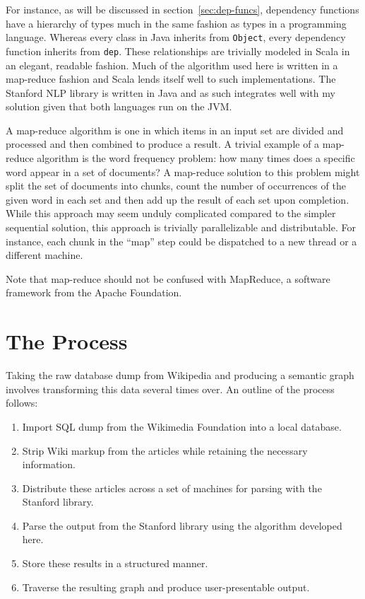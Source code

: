 For instance, as will be discussed in section~\ref{sec:dep-funcs}, dependency functions have a hierarchy of types much in the same fashion as types in a programming language.  Whereas every class in Java inherits from \verb|Object|, every dependency function inherits from \verb|dep|.  These relationships are trivially modeled in Scala in an elegant, readable fashion.  Much of the algorithm used here is written in a map-reduce fashion and Scala lends itself well to such implementations.  The Stanford NLP library is written in Java and as such integrates well with my solution given that both languages run on the JVM.  

A map-reduce algorithm is one in which items in an input set are divided and processed and then combined to produce a result.  A trivial example of a map-reduce algorithm is the word frequency problem: how many times does a specific word appear in a set of documents?  A map-reduce solution to this problem might split the set of documents into chunks, count the number of occurrences of the given word in each set and then add up the result of each set upon completion.  While this approach may seem unduly complicated compared to the simpler sequential solution, this approach is trivially parallelizable and distributable.  For instance, each chunk in the ``map'' step could be dispatched to a new thread or a different machine.  

Note that map-reduce should not be confused with MapReduce, a software framework from the Apache Foundation.  

\chapter{The Process}

Taking the raw database dump from Wikipedia and producing a semantic graph involves transforming this data several times over.  An outline of the process follows:

\begin{enumerate}
\item Import SQL dump from the Wikimedia Foundation into a local database.
\item Strip Wiki markup from the articles while retaining the necessary information. 
\item Distribute these articles across a set of machines for parsing with the Stanford library.
\item Parse the output from the Stanford library using the algorithm developed here.
\item Store these results in a structured manner.
\item Traverse the resulting graph and produce user-presentable output.
\end{enumerate}

